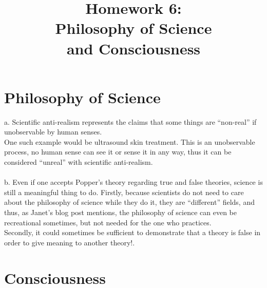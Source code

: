 \documentclass[english]{report}
\begin{document}
\title{Homework 6: \\ Philosophy of Science \\ and Consciousness}

\maketitle

\clearpage
\chapter{Philosophy of Science}

a. Scientific anti-realism represents the claims that some things are ``non-real'' if unobservable by human senses. \\
One such example would be ultrasound skin treatment. This is an unobservable process, no human sense can see it or sense it in any way, thus it can be considered ``unreal'' with scientific anti-realism.
\\\\
b. Even if one accepts Popper's theory regarding true and false theories, science is still a meaningful thing to do. Firstly, because scientists do not need to care about the philosophy of science while they do it, they are ``different'' fields, and thus, as Janet's blog post mentions, the philosophy of science can even be recreational sometimes, but not needed for the one who practices. \\
Secondly, it could sometimes be sufficient to demonstrate that a theory is false in order to give meaning to another theory!.

\chapter{Consciousness}
\end{document}
